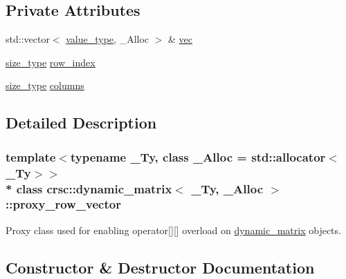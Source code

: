 \subsection*{Private Attributes}
\begin{DoxyCompactItemize}
\item 
std\+::vector$<$ \hyperlink{classcrsc_1_1dynamic__matrix_a27b83d28002e3e2bb316f1f0460e9cca}{value\+\_\+type}, \+\_\+\+Alloc $>$ \& \hyperlink{classcrsc_1_1dynamic__matrix_1_1proxy__row__vector_a8f98e13d29cac1555690c8ea6313d428}{vec}
\item 
\hyperlink{classcrsc_1_1dynamic__matrix_a52b776dc7f60d8798c884d7d3c361a8a}{size\+\_\+type} \hyperlink{classcrsc_1_1dynamic__matrix_1_1proxy__row__vector_a07775ac5fb7d5430fdc2de197f811feb}{row\+\_\+index}
\item 
\hyperlink{classcrsc_1_1dynamic__matrix_a52b776dc7f60d8798c884d7d3c361a8a}{size\+\_\+type} \hyperlink{classcrsc_1_1dynamic__matrix_1_1proxy__row__vector_a45ffa62f998845b9d8a8a21444cf5ef8}{columns}
\end{DoxyCompactItemize}


\subsection{Detailed Description}
\subsubsection*{template$<$typename \+\_\+\+Ty, class \+\_\+\+Alloc = std\+::allocator$<$\+\_\+\+Ty$>$$>$\\*
class crsc\+::dynamic\+\_\+matrix$<$ \+\_\+\+Ty, \+\_\+\+Alloc $>$\+::proxy\+\_\+row\+\_\+vector}

Proxy class used for enabling operator\mbox{[}\mbox{]}\mbox{[}\mbox{]} overload on \hyperlink{classcrsc_1_1dynamic__matrix}{dynamic\+\_\+matrix} objects. 

\subsection{Constructor \& Destructor Documentation}
